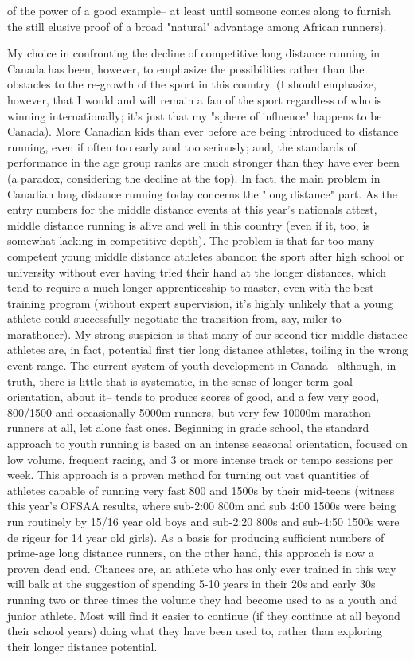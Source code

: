 of the power of a good example-- at least until someone comes along to furnish the still elusive proof of a broad "natural" advantage among African runners).

My choice in confronting the decline of competitive long distance running in Canada has been, however, to emphasize the possibilities rather than the obstacles to the re-growth of the sport in this country. (I should emphasize, however, that I would and will remain a fan of the sport regardless of who is winning internationally; it's just that my "sphere of influence" happens to be Canada). More Canadian kids than ever before are being introduced to distance running, even if often too early and too seriously; and, the standards of performance in the age group ranks are much stronger than they have ever been (a paradox, considering the decline at the top). In fact, the main problem in Canadian long distance running today concerns the "long distance" part. As the entry numbers for the middle distance events at this year's nationals attest, middle distance running is alive and well in this country (even if it, too, is somewhat lacking in competitive depth). The problem is that far too many competent young middle distance athletes abandon the sport after high school or university without ever having tried their hand at the longer distances, which tend to require a much longer apprenticeship to master, even with the best training program (without expert supervision, it's highly unlikely that a young athlete could successfully negotiate the transition from, say, miler to marathoner). My strong suspicion is that many of our second tier middle distance athletes are, in fact, potential first tier long distance athletes, toiling in the wrong event range. The current system of youth development in Canada-- although, in truth, there is little that is systematic, in the sense of longer term goal orientation, about it-- tends to produce scores of good, and a few very good, 800/1500 and occasionally 5000m runners, but very few 10000m-marathon runners at all, let alone fast ones. Beginning in grade school, the standard approach to youth running is based on an intense seasonal orientation, focused on low volume, frequent racing, and 3 or more intense track or tempo sessions per week. This approach is a proven method for turning out vast quantities of athletes capable of running very fast 800 and 1500s by their mid-teens (witness this year's OFSAA results, where sub-2:00 800m and sub 4:00 1500s were being run routinely by 15/16 year old boys and sub-2:20 800s and sub-4:50 1500s were de rigeur for 14 year old girls). As a basis for producing sufficient numbers of prime-age long distance runners, on the other hand, this approach is now a proven dead end. Chances are, an athlete who has only ever trained in this way will balk at the suggestion of spending 5-10 years in their 20s and early 30s running two or three times the volume they had become used to as a youth and junior athlete. Most will find it easier to continue (if they continue at all beyond their school years) doing what they have been used to, rather than exploring their longer distance potential.

